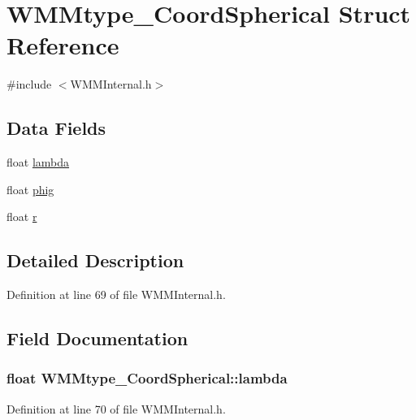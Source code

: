 \hypertarget{struct_w_m_mtype___coord_spherical}{\section{W\-M\-Mtype\-\_\-\-Coord\-Spherical Struct Reference}
\label{struct_w_m_mtype___coord_spherical}
}


{\ttfamily \#include $<$W\-M\-M\-Internal.\-h$>$}

\subsection*{Data Fields}
\begin{DoxyCompactItemize}
\item 
float \hyperlink{struct_w_m_mtype___coord_spherical_ac23771e3c14027441154228a3526bbfc}{lambda}
\item 
float \hyperlink{struct_w_m_mtype___coord_spherical_a94d857d131a4281543b46b4f3dc2a28e}{phig}
\item 
float \hyperlink{struct_w_m_mtype___coord_spherical_ad7a66b81a59d40782c0618c94256073f}{r}
\end{DoxyCompactItemize}


\subsection{Detailed Description}


Definition at line 69 of file W\-M\-M\-Internal.\-h.



\subsection{Field Documentation}
\hypertarget{struct_w_m_mtype___coord_spherical_ac23771e3c14027441154228a3526bbfc}{
\subsubsection[{lambda}]{\setlength{\rightskip}{0pt plus 5cm}float W\-M\-Mtype\-\_\-\-Coord\-Spherical\-::lambda}}\label{struct_w_m_mtype___coord_spherical_ac23771e3c14027441154228a3526bbfc}


Definition at line 70 of file W\-M\-M\-Internal.\-h.

